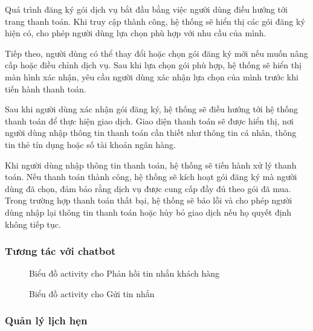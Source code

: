 \par Quá trình đăng ký gói dịch vụ bắt đầu bằng việc người dùng điều hướng tới trang thanh toán. Khi truy cập thành công, hệ thống sẽ hiển thị các gói đăng ký hiện có, cho phép người dùng lựa chọn phù hợp với nhu cầu của mình.

Tiếp theo, người dùng có thể thay đổi hoặc chọn gói đăng ký mới nếu muốn nâng cấp hoặc điều chỉnh dịch vụ. Sau khi lựa chọn gói phù hợp, hệ thống sẽ hiển thị màn hình xác nhận, yêu cầu người dùng xác nhận lựa chọn của mình trước khi tiến hành thanh toán.

Sau khi người dùng xác nhận gói đăng ký, hệ thống sẽ điều hướng tới hệ thống thanh toán để thực hiện giao dịch. Giao diện thanh toán sẽ được hiển thị, nơi người dùng nhập thông tin thanh toán cần thiết như thông tin cá nhân, thông tin thẻ tín dụng hoặc số tài khoản ngân hàng.

Khi người dùng nhập thông tin thanh toán, hệ thống sẽ tiến hành xử lý thanh toán. Nếu thanh toán thành công, hệ thống sẽ kích hoạt gói đăng ký mà người dùng đã chọn, đảm bảo rằng dịch vụ được cung cấp đầy đủ theo gói đã mua. Trong trường hợp thanh toán thất bại, hệ thống sẽ báo lỗi và cho phép người dùng nhập lại thông tin thanh toán hoặc hủy bỏ giao dịch nếu họ quyết định không tiếp tục.


\subsubsection{Tương tác với chatbot}
\begin{figure}[H]
    \centering
     
    \vspace{0.5cm}
    \caption{Biểu đồ activity cho Phản hồi tin nhắn khách hàng}
    \label{fig:enter-label}
\end{figure}
\begin{figure}[H]
    \centering
     
    \vspace{0.5cm}
    \caption{Biểu đồ activity cho Gửi tin nhắn}
    \label{fig:enter-label}
\end{figure}

\subsubsection{Quản lý lịch hẹn}




